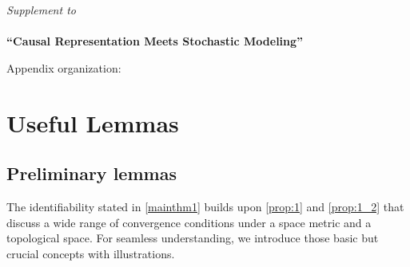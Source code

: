 \documentclass[10pt]{article}
\newcommand\DoToC{%
  \startcontents
  \printcontents{}{1}{\hrulefill\vskip0pt}
  \vskip0pt \noindent\hrulefill
  }
\numberwithin{figure}{section}
\begin{document}
\clearpage
\appendix
  \textit{\large Supplement to}\\ \ \\
      {\Large \bf ``Causal Representation Meets Stochastic Modeling''}\
\newcommand{\beginsupplement}{%
\setcounter{tocdepth}{2} %
	\renewcommand{\thetable}{A\arabic{table}}%

	
	\renewcommand{\thefigure}{A\arabic{figure}}%
	
	
	\setcounter{section}{0}\renewcommand{\theHsection}{A\arabic{section}}%

    \setcounter{theorem}{0}
    \renewcommand{\thetheorem}{A\arabic{theorem}}%

    \setcounter{corollary}{0}
    \renewcommand{\thecorollary}{A\arabic{corollary}}%


}


{\large Appendix organization:}

{
\DoToC
}
\clearpage


\section{Useful Lemmas}\label{useful_lemma}

\subsection{Preliminary lemmas}
The identifiability stated in \autoref{mainthm1} builds upon  \autoref{prop:1} and \autoref{prop:1_2} that discuss a wide range of convergence conditions under a space metric and a topological space.  For seamless understanding, we introduce those basic but crucial concepts with illustrations.
\end{document}
